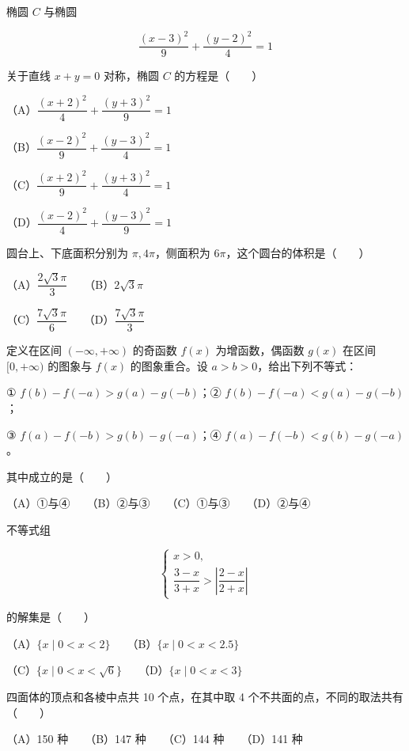 \begin{question}
椭圆 $C$ 与椭圆

\nopagebreak[4]
\[
\dfrac{(x-3)^2}{9}+\dfrac{(y-2)^2}{4}=1
\]

关于直线 $x+y=0$ 对称，椭圆 $C$ 的方程是\mbox{（　　）}

（A）$\dfrac{(x+2)^2}{4}+\dfrac{(y+3)^2}{9}=1$

（B）$\dfrac{(x-2)^2}{9}+\dfrac{(y-3)^2}{4}=1$

（C）$\dfrac{(x+2)^2}{9}+\dfrac{(y+3)^2}{4}=1$

（D）$\dfrac{(x-2)^2}{4}+\dfrac{(y-3)^2}{9}=1$

\end{question}
\begin{question}
圆台上、下底面积分别为 $\pi,4\pi$，侧面积为 $6\pi$，这个圆台的体积是\mbox{（　　）}

（A）$\dfrac{2\sqrt3\pi}{3}$　　（B）$2\sqrt3\pi$

（C）$\dfrac{7\sqrt3\pi}{6}$　　（D）$\dfrac{7\sqrt3\pi}{3}$

\end{question}
\begin{question}
定义在区间 $(-\infty,+\infty)$ 的奇函数 $f(x)$ 为增函数，偶函数 $g(x)$ 在区间 $[0,+\infty)$ 的图象与 $f(x)$ 的图象重合。设 $a>b>0$，给出下列不等式：

① $f(b)-f(-a)>g(a)-g(-b)$；② $f(b)-f(-a)<g(a)-g(-b)$；

③ $f(a)-f(-b)>g(b)-g(-a)$；④ $f(a)-f(-b)<g(b)-g(-a)$。

其中成立的是\mbox{（　　）}

（A）①与④　　（B）②与③　　（C）①与③　　（D）②与④

\end{question}
\begin{question}
不等式组

\nopagebreak[4]
\[
\begin{cases}
x>0,\\[2pt]
\dfrac{3-x}{3+x}>\left|\dfrac{2-x}{2+x}\right|
\end{cases}
\]

的解集是\mbox{（　　）}

（A）$\{x\mid0<x<2\}$　　（B）$\{x\mid0<x<2.5\}$

（C）$\{x\mid0<x<\sqrt6\}$　　（D）$\{x\mid0<x<3\}$

\end{question}
\begin{question}
四面体的顶点和各棱中点共 10 个点，在其中取 4 个不共面的点，不同的取法共有\mbox{（　　）}

（A）150 种　　（B）147 种　　（C）144 种　　（D）141 种

\end{question}
